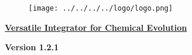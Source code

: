 
\begin{center} 
\begin{figure}[!h] 
\centering 
\texttt{[image: ../../../../logo/logo.png]} 
\end{figure} 
\underline{\LARGE \textbf{Versatile Integrator for Chemical Evolution}} 
\par 
{\Large \textbf{Version 1.2.1}} 
\end{center}
